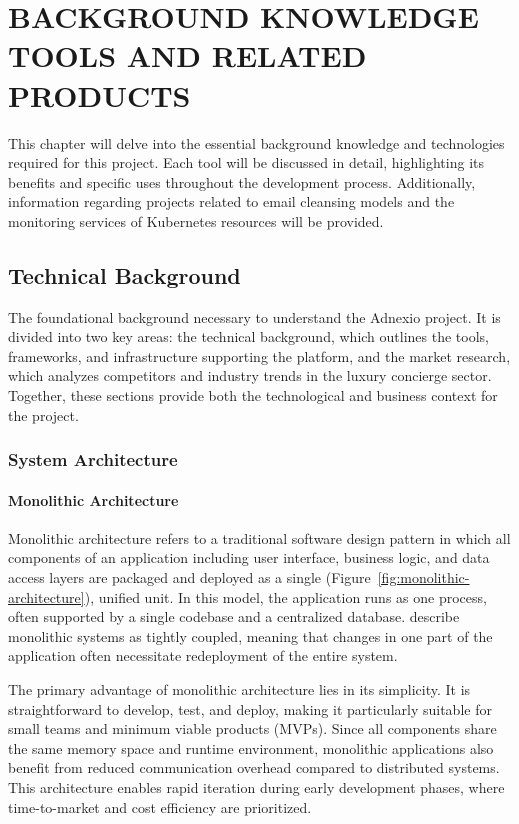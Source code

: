 \chapter{BACKGROUND KNOWLEDGE
TOOLS AND RELATED PRODUCTS
}

This chapter will delve into the essential background knowledge and technologies required for this project. Each tool will be discussed in detail, highlighting its benefits and specific uses throughout the development process. Additionally, information regarding projects related to email cleansing models and the monitoring services of Kubernetes resources will be provided.

\section{Technical Background}
The foundational background necessary to understand the Adnexio project. It is divided into two key areas: the technical background, which outlines the tools, frameworks, and infrastructure supporting the platform, and the market research, which analyzes competitors and industry trends in the luxury concierge sector. Together, these sections provide both the technological and business context for the project.

\subsection{System Architecture}
\subsubsection{Monolithic Architecture}


Monolithic architecture refers to a traditional software design pattern in which all components of an application including user interface, business logic, and data access layers are packaged and deployed as a single (Figure~\ref{fig:monolithic-architecture}), unified unit. In this model, the application runs as one process, often supported by a single codebase and a centralized database. \cite{thalor2024monolithic} describe monolithic systems as tightly coupled, meaning that changes in one part of the application often necessitate redeployment of the entire system.

The primary advantage of monolithic architecture lies in its simplicity. It is straightforward to develop, test, and deploy, making it particularly suitable for small teams and minimum viable products (MVPs). Since all components share the same memory space and runtime environment, monolithic applications also benefit from reduced communication overhead compared to distributed systems. This architecture enables rapid iteration during early development phases, where time-to-market and cost efficiency are prioritized.




